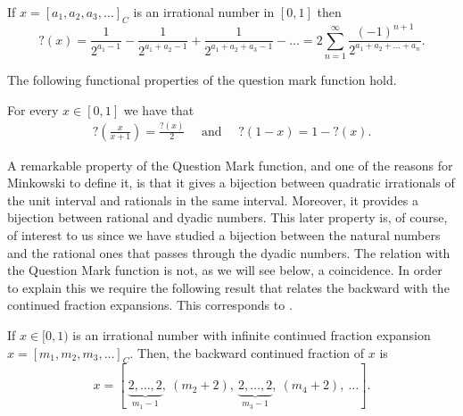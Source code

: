 \documentclass[letterpaper,10pt,reqno]{amsart}
\numberwithin{equation}{section}     %
\begin{document}
\begin{proposition}[Denjoy]\label{denjoy}
If $x=[a_1, a_2, a_3, \dots]_C$ is an irrational number in $[0,1]$ then
\begin{equation*}
?(x)= \frac{1}{2^{a_1-1}} - \frac{1}{2^{a_1+a_2-1}} + \frac{1}{2^{a_1+a_2+a_3-1}}- \dots = 2 \sum_{n=1}^{\infty} \frac{(-1)^{n+1}}{2^{a_1+a_2 + \dots + a_n}}.
\end{equation*}
\end{proposition}
 
 The following functional properties of the question mark function hold.
 
 
\begin{lemma} \label{pro}
For every $x \in [0,1]$ we have that
\begin{eqnarray*}
?\left( \frac{x}{x+1} \right) = \frac{?(x)}{2} \quad \text{ and }  \quad 
?(1-x)= 1- ?(x).
\end{eqnarray*}
\end{lemma}
 
 
A remarkable property of the Question Mark function,  and one of the reasons for Minkowski to define it, is that it gives a bijection between quadratic irrationals of the unit interval and rationals in the same interval. Moreover, it provides a bijection between rational and dyadic numbers. This later property is, of course, of interest to us since we have studied a bijection between the natural numbers and the rational ones that passes through the dyadic numbers. The relation with the Question Mark function is not, as we will see below, {{}{a}} coincidence. In order to explain this we require the following result that relates the backward with the continued fraction expansions. This corresponds to \cite[Exercise 10. p.128]{ka}.

  
 
 \begin{lemma}\label{CFaBCF}
If $x\in [0,1)$ is an irrational  number with infinite continued fraction expansion $x=[m_1, m_2, m_3, \dots]_C$. Then,  the backward continued fraction of $x$ is
\begin{equation}\label{deCFaBCF}
x=[\ \underbrace{2,\dots, 2}_{m_1-1}, \ (m_2+2),\  \underbrace{2,\dots, 2}_{m_3-1}, \ (m_4+2),\  \dots].
\end{equation}
\end{lemma}
\end{document}
